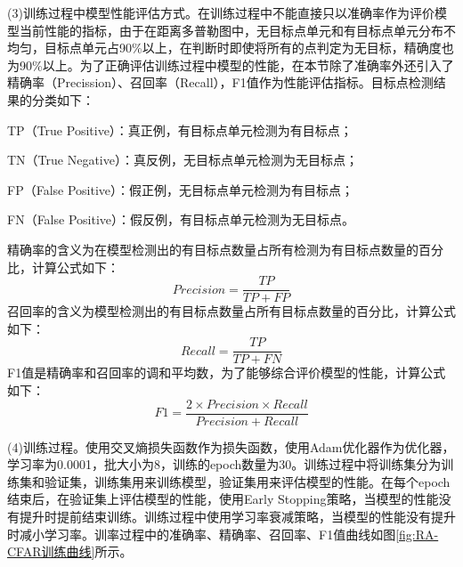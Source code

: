 (3)训练过程中模型性能评估方式。在训练过程中不能直接只以准确率作为评价模型当前性能的指标，由于在距离多普勒图中，无目标点单元和有目标点单元分布不均匀，目标点单元占90\%以上，在判断时即使将所有的点判定为无目标，精确度也为90\%以上。为了正确评估训练过程中模型的性能，在本节除了准确率外还引入了精确率（Precission）、召回率（Recall），F1值作为性能评估指标\cite{goutte2005probabilistic}。目标点检测结果的分类如下：
\par TP（True Positive）：真正例，有目标点单元检测为有目标点；
\par TN（True Negative）：真反例，无目标点单元检测为无目标点；
\par FP（False Positive）：假正例，无目标点单元检测为有目标点；
\par FN（False Positive）：假反例，有目标点单元检测为无目标点。
\par 
精确率的含义为在模型检测出的有目标点数量占所有检测为有目标点数量的百分比，计算公式如下：
\begin{equation}
	\label{eq:精确率}
	Precision = \frac{TP}{TP+FP}
\end{equation}
召回率的含义为模型检测出的有目标点数量占所有目标点数量的百分比，计算公式如下：
\begin{equation}
	\label{eq:召回率}
	Recall = \frac{TP}{TP+FN}
\end{equation}
F1值是精确率和召回率的调和平均数，为了能够综合评价模型的性能，计算公式如下：
\begin{equation}
	\label{eq:F1值}
	F1 = \frac{2 \times Precision \times Recall}{Precision + Recall}
\end{equation}

(4)训练过程。使用交叉熵损失函数作为损失函数\cite{4767189}，使用Adam优化器作为优化器，学习率为0.0001，批大小为8，训练的epoch数量为30。训练过程中将训练集分为训练集和验证集，训练集用来训练模型，验证集用来评估模型的性能。在每个epoch结束后，在验证集上评估模型的性能，使用Early Stopping策略\cite{yao2007early}，当模型的性能没有提升时提前结束训练。训练过程中使用学习率衰减策略，当模型的性能没有提升时减小学习率。训率过程中的准确率、精确率、召回率、F1值曲线如图\ref{fig:RA-CFAR训练曲线}所示。

